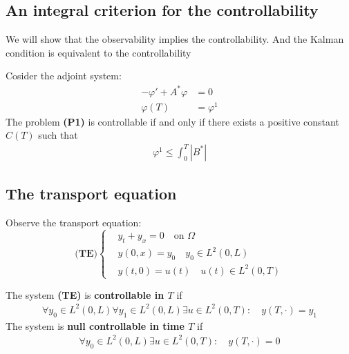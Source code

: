 \subsection*{An integral criterion for the controllability}

\begin{definition}[resolvent]
\end{definition}

\begin{theorem}
\end{theorem}

\begin{definition}
\end{definition}

\begin{theorem}
\end{theorem}

We will show that the observability implies the controllability. And the Kalman condition is equivalent to the controllability

\begin{theorem}
Cosider the adjoint system:
\begin{align}
	-\varphi' + A^* \varphi &= 0\\
	\varphi(T) &= \varphi^1
\end{align}	The problem \textbf{(P1)} is controllable if and only if there exists a positive constant $C(T)$ such that
\begin{align}
	\varphi^1 \le \int_0^T | B^*|
\end{align} 
\end{theorem}


\subsection{The transport equation}
Observe the transport equation:
\begin{equation*}
\textbf{(TE)}
	\left\{
	\begin{aligned}
		&y_t + y_x = 0 \quad \text{on } \Omega \\
		&y(0, x) = y_0 \quad y_0 \in L^2(0, L)\\
		&y(t, 0) = u(t) \quad u(t) \in L^2(0, T)
	\end{aligned}
	\right.
\end{equation*}


\begin{definition}
	The system \textbf{(TE)} is \textbf{controllable in $T$} if 
	\begin{align*}
		\forall y_0 \in L^2(0, L) \forall y_1 \in L^2(0, L) \exists u \in L^2(0, T):\quad  y(T,\cdot) = y_1
	\end{align*} 
	The system is \textbf{null controllable in time $T$} if 
	\begin{align*}
		\forall y_0 \in L^2(0, L) \exists u \in L^2(0, T):\quad  y(T,\cdot) = 0
	\end{align*}
\end{definition}


